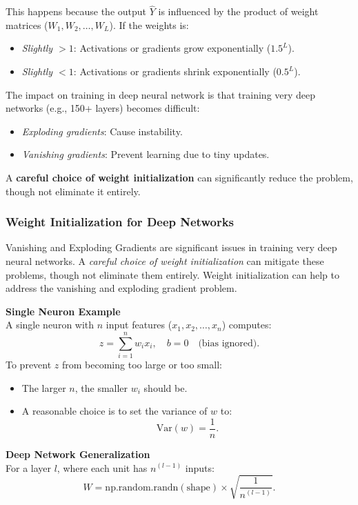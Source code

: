 \documentclass[letterpaper,12pt,notitlepage,twoside]{report}
\begin{document}
This happens because the output $\hat{Y}$ is influenced by the product of weight matrices ($W_1, W_2, \dots, W_L$). If the weights is:
    \begin{itemize}
        \item \textit{Slightly $> 1$}: Activations or gradients grow exponentially ($1.5^L$).
        \item \textit{Slightly $< 1$}: Activations or gradients shrink exponentially ($0.5^L$).
    \end{itemize}

The impact on training in deep neural network is that training very deep networks (e.g., 150+ layers) becomes difficult:
    \begin{itemize}
        \item \textit{Exploding gradients}: Cause instability.
        \item \textit{Vanishing gradients}: Prevent learning due to tiny updates.
    \end{itemize}

A \textbf{careful choice of weight initialization} can significantly reduce the problem, though not eliminate it entirely.

\subsubsection{Weight Initialization for Deep Networks}
Vanishing and Exploding Gradients are significant issues in training very deep neural networks. A \textit{careful choice of weight initialization} can mitigate these problems, though not eliminate them entirely. Weight initialization can help to address the vanishing and exploding gradient problem.

\textbf{Single Neuron Example} \\
A single neuron with \( n \) input features (\( x_1, x_2, \dots, x_n \)) computes:
\[
z = \sum_{i=1}^n w_i x_i, \quad b = 0 \quad \text{(bias ignored)}.
\]
To prevent \( z \) from becoming too large or too small:
\begin{itemize}
    \item The larger \( n \), the smaller \( w_i \) should be.
    \item A reasonable choice is to set the variance of \( w \) to:
    \[
    \text{Var}(w) = \frac{1}{n}.
    \]
\end{itemize}

\textbf{Deep Network Generalization} \\
For a layer \( l \), where each unit has \( n^{(l-1)} \) inputs:
\[
W = \text{np.random.randn}(\text{shape}) \times \sqrt{\frac{1}{n^{(l-1)}}}.
\]
\end{document}
